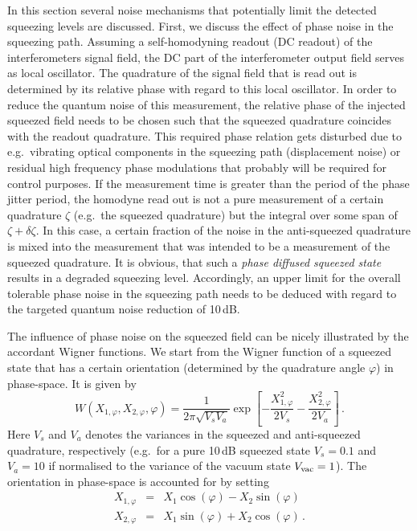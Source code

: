 In this section several noise mechanisms that potentially limit the detected squeezing levels are discussed. First, we discuss the effect of phase noise in the squeezing path. Assuming a self-homodyning readout (DC readout) of the interferometers  signal field, the DC part of the interferometer output field serves as local oscillator. The quadrature of the signal field that is read out is determined by its relative phase with regard to this local oscillator. In order to reduce the quantum noise of this measurement, the relative phase of the injected squeezed field needs to be chosen such that the squeezed quadrature coincides with the readout quadrature. This required phase relation gets disturbed due to e.g.\ vibrating optical components in the squeezing path (displacement noise) or residual high frequency phase modulations that probably will be required for control purposes.  If the measurement time is greater than the period of the phase jitter period, the homodyne read out is not a pure measurement of a certain quadrature   $\zeta$ (e.g.\ the squeezed quadrature) but the integral over some span of $\zeta+\delta \zeta$. In this case, a certain fraction of the noise in the anti-squeezed quadrature is mixed into the measurement that was intended to be a measurement of the squeezed quadrature. It is obvious, that such a \textit{phase diffused squeezed state}  results in a degraded squeezing level.  Accordingly, an upper limit for the overall tolerable phase noise in the squeezing path needs to be deduced with regard to the targeted quantum noise reduction of 10\,dB.

The influence of phase noise on the squeezed field can be nicely illustrated by the accordant Wigner functions. We start from the Wigner function of a squeezed state that has a certain orientation (determined by the quadrature angle  $\varphi$) in phase-space. It is  given by
\begin{equation}
W(X_{1,\varphi},X_{2,\varphi}, \varphi) = \frac{1}{2\pi\sqrt{V_sV_a}}\exp\left[-\frac{X_{1,\varphi}^2}{2V_s}-\frac{X_{2,\varphi}^2}{2V_a}\right]\,.
\end{equation}
Here $V_s$ and $V_a$ denotes the variances in the squeezed and anti-squeezed quadrature, respectively (e.g.\ for a pure 10\,dB squeezed state  $V_s=0.1$ and $V_a=10$ if normalised to the variance of the vacuum state $V_{\rm{vac}}=1$).  The orientation in phase-space is accounted for by setting
\begin{eqnarray}
X_{1,\varphi} &=& X_1\cos(\varphi) - X_2\sin(\varphi)\\
X_{2,\varphi}  &= &X_1\sin(\varphi) + X_2\cos(\varphi)\,.
\end{eqnarray}%

